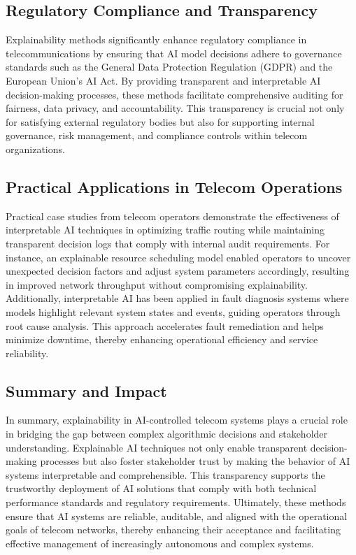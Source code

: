 \documentclass[sigconf]{acmart}
\begin{document}
\subsection{Regulatory Compliance and Transparency}

Explainability methods significantly enhance regulatory compliance in telecommunications by ensuring that AI model decisions adhere to governance standards such as the General Data Protection Regulation (GDPR) and the European Union’s AI Act. By providing transparent and interpretable AI decision-making processes, these methods facilitate comprehensive auditing for fairness, data privacy, and accountability. This transparency is crucial not only for satisfying external regulatory bodies but also for supporting internal governance, risk management, and compliance controls within telecom organizations.

\subsection{Practical Applications in Telecom Operations}

Practical case studies from telecom operators demonstrate the effectiveness of interpretable AI techniques in optimizing traffic routing while maintaining transparent decision logs that comply with internal audit requirements. For instance, an explainable resource scheduling model enabled operators to uncover unexpected decision factors and adjust system parameters accordingly, resulting in improved network throughput without compromising explainability. Additionally, interpretable AI has been applied in fault diagnosis systems where models highlight relevant system states and events, guiding operators through root cause analysis. This approach accelerates fault remediation and helps minimize downtime, thereby enhancing operational efficiency and service reliability.

\subsection{Summary and Impact}

In summary, explainability in AI-controlled telecom systems plays a crucial role in bridging the gap between complex algorithmic decisions and stakeholder understanding. Explainable AI techniques not only enable transparent decision-making processes but also foster stakeholder trust by making the behavior of AI systems interpretable and comprehensible. This transparency supports the trustworthy deployment of AI solutions that comply with both technical performance standards and regulatory requirements. Ultimately, these methods ensure that AI systems are reliable, auditable, and aligned with the operational goals of telecom networks, thereby enhancing their acceptance and facilitating effective management of increasingly autonomous and complex systems.
\end{document}
